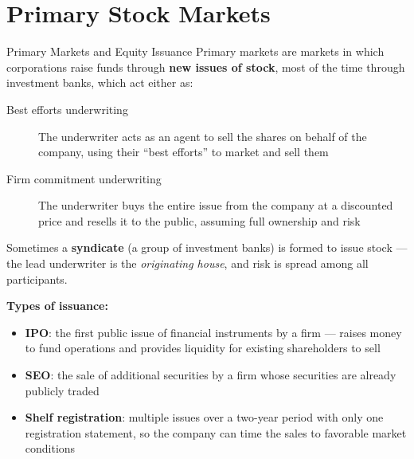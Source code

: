 \documentclass[aspectratio=169]{beamer}
\begin{document}

\section{Primary Stock Markets}

\begin{frame}{Primary Markets and Equity Issuance}
Primary markets are markets in which corporations raise funds through \textbf{new issues of stock}, most of the time through investment banks, which act either as:
\begin{description}
  \item[Best efforts underwriting] The underwriter acts as an agent to sell the shares on behalf of the company, using their ``best efforts'' to market and sell them
  \item[Firm commitment underwriting] The underwriter buys the entire issue from the company at a discounted price and resells it to the public, assuming full ownership and risk
\end{description}
Sometimes a \textbf{syndicate} (a group of investment banks) is formed to issue stock --- the lead underwriter is the \emph{originating house}, and risk is spread among all participants.
\vspace{0.3em}

\textbf{Types of issuance:}
\begin{itemize}
  \item \textbf{IPO}: the first public issue of financial instruments by a firm --- raises money to fund operations and provides liquidity for existing shareholders to sell
  \item \textbf{SEO}: the sale of additional securities by a firm whose securities are already publicly traded
  \item \textbf{Shelf registration}: multiple issues over a two-year period with only one registration statement, so the company can time the sales to favorable market conditions
\end{itemize}
\end{frame}
\end{document}
